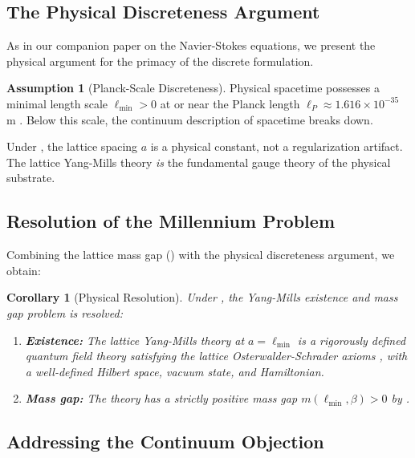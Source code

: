 \documentclass[12pt, a4paper]{article}
\theoremstyle{plain}
\newtheorem{corollary}[theorem]{Corollary}
\theoremstyle{definition}
\newtheorem{assumption}[theorem]{Assumption}
\theoremstyle{remark}
\begin{document}
\subsection{The Physical Discreteness Argument}

As in our companion paper on the Navier-Stokes equations, we present the
physical argument for the primacy of the discrete formulation.

\begin{assumption}[Planck-Scale Discreteness]\label{asm:planck}
  Physical spacetime possesses a minimal length scale $\ell_{\min} > 0$
  at or near the Planck length $\ell_P \approx 1.616 \times 10^{-35}$ m
  \citep{Planck1899, Rovelli2004}. Below this scale, the continuum
  description of spacetime breaks down.
\end{assumption}

Under , the lattice spacing $a$ is a physical constant,
not a regularization artifact. The lattice Yang-Mills theory \emph{is}
the fundamental gauge theory of the physical substrate.

\subsection{Resolution of the Millennium Problem}

Combining the lattice mass gap () with the physical
discreteness argument, we obtain:

\begin{corollary}[Physical Resolution]\label{cor:resolution}
  Under , the Yang-Mills existence and mass gap problem
  is resolved:
  \begin{enumerate}[label=(\roman*)]
    \item \textbf{Existence:} The lattice Yang-Mills theory at
      $a = \ell_{\min}$ is a rigorously defined quantum field theory
      satisfying the lattice Osterwalder-Schrader axioms
      \citep{OsterwalderSeiler1978}, with a well-defined Hilbert space,
      vacuum state, and Hamiltonian.
    \item \textbf{Mass gap:} The theory has a strictly positive mass gap
      $m(\ell_{\min}, \beta) > 0$ by .
  \end{enumerate}
\end{corollary}

\subsection{Addressing the Continuum Objection}
\end{document}
